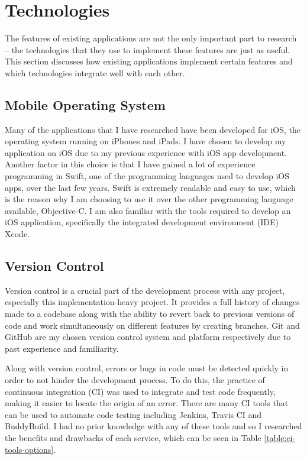 \section{Technologies} \label{section:technologies}

The features of existing applications are not the only important part to research -- the technologies that they use to implement these features are just as useful. This section discusses how existing applications implement certain features and which technologies integrate well with each other.

\subsection{Mobile Operating System}

Many of the applications that I have researched have been developed for iOS, the operating system running on iPhones and iPads. I have chosen to develop my application on iOS due to my previous experience with iOS app development. Another factor in this choice is that I have gained a lot of experience programming in Swift, one of the programming languages used to develop iOS apps, over the last few years. Swift is extremely readable and easy to use, which is the reason why I am choosing to use it over the other programming language available, Objective-C. I am also familiar with the tools required to develop an iOS application, specifically the integrated development environment (IDE) Xcode.

\subsection{Version Control} \label{subsection:version-control}

Version control is a crucial part of the development process with any project, especially this implementation-heavy project. It provides a full history of changes made to a codebase along with the ability to revert back to previous versions of code and work simultaneously on different features by creating branches. Git and GitHub are my chosen version control system and platform respectively due to past experience and familiarity.

Along with version control, errors or bugs in code must be detected quickly in order to not hinder the development process. To do this, the practice of continuous integration (CI) was used to integrate and test code frequently, making it easier to locate the origin of an error. There are many CI tools that can be used to automate code testing including Jenkins, Travis CI and BuddyBuild. I had no prior knowledge with any of these tools and so I researched the benefits and drawbacks of each service, which can be seen in Table \ref{table:ci-tools-options}.

